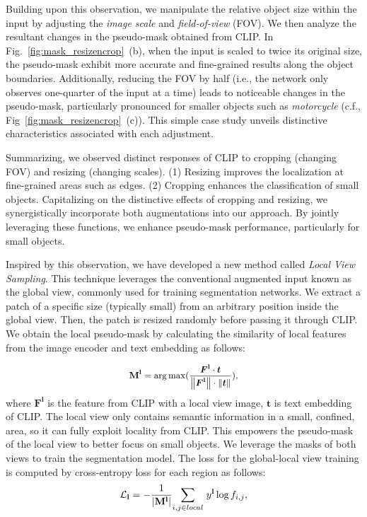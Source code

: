 \documentclass[letterpaper]{article} %
\def\ie{i.e.} \def\Ie{I.e.}
\def\cf{c.f.} \def\Cf{C.f.}
\begin{document}
Building upon this observation, we manipulate the relative object size within the input by adjusting the \emph{image scale} and \emph{field-of-view} (FOV). We then analyze the resultant changes in the pseudo-mask obtained from CLIP. In Fig.~\ref{fig:mask_resizencrop}~(b), when the input is scaled to twice its original size, the pseudo-mask exhibit more accurate and fine-grained results along the object boundaries. Additionally, reducing the FOV by half (\ie, the network only observes one-quarter of the input at a time) leads to noticeable changes in the pseudo-mask, particularly pronounced for smaller objects such as \textit{motorcycle} (\cf, Fig~\ref{fig:mask_resizencrop}~(c)). This simple case study unveils distinctive characteristics associated with each adjustment. 

Summarizing, we observed distinct responses of CLIP to cropping (changing FOV) and resizing (changing scales). (1) Resizing improves the localization at fine-grained areas such as edges. (2) Cropping enhances the classification of small objects. Capitalizing on the distinctive effects of cropping and resizing, we synergistically incorporate both augmentations into our approach. By jointly leveraging these functions, we enhance pseudo-mask performance, particularly for small objects. 

Inspired by this observation, we have developed a new method called \textit{Local View Sampling}. This technique leverages the conventional augmented input known as the global view, commonly used for training segmentation networks. We extract a patch of a specific size (typically small) from an arbitrary position inside the global view. Then, the patch is resized randomly before passing it through CLIP. We obtain the local pseudo-mask by calculating the similarity of local features from the image encoder and text embedding as follows:

\begin{equation}
\label{eq_local_mask}
{\small
\mathbf{M}^\mathbf{l} = \arg \max(\frac{\boldsymbol{F}^\mathbf{l} \cdot \boldsymbol{t}}{\left \| \boldsymbol{F}^\mathbf{l} \right \| \cdot \left \| \boldsymbol{t} \right \|}),
}
\end{equation} %
%
where $\boldsymbol{F}^\mathbf{l}$ is the feature from CLIP with a local view image, $\boldsymbol{t}$ is text embedding of CLIP. The local view only contains semantic information in a small, confined, area, so it can fully exploit locality from CLIP. This empowers the pseudo-mask of the local view to better focus on small objects. We leverage the masks of both views to train the segmentation model. The loss for the global-local view training is computed by cross-entropy loss for each region as follows:
\begin{equation}
\label{eq_loss_loc}
{\small
\mathcal{L}_\mathbf{l} = - \frac{1}{|\mathbf{M}^\mathbf{l}|} \underset{i,j \in local}{\sum} \text{ } y^\mathbf{l} \log {f_{i,j}},
}
\end{equation}
\end{document}
